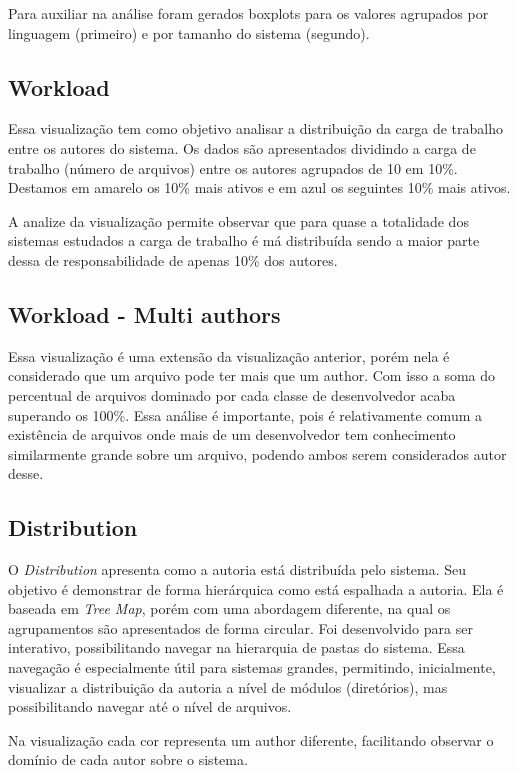 \documentclass[12pt]{article}
\begin{document}
Para auxiliar na análise foram gerados boxplots para os valores agrupados por linguagem (primeiro) e por tamanho do sistema (segundo).


\subsection{Workload}

Essa visualização tem como objetivo analisar a distribuição da carga de trabalho entre os autores do sistema. Os dados são apresentados dividindo a carga de trabalho (número de arquivos) entre os autores agrupados de 10 em 10\%. Destamos em amarelo os 10\% mais ativos e em azul os seguintes 10\% mais ativos. 

A analize da visualização permite observar que para quase a totalidade dos sistemas estudados a carga de trabalho é má distribuída sendo a maior parte dessa de responsabilidade de apenas 10\% dos autores.

\subsection{Workload - Multi authors}

Essa visualização é uma extensão da visualização anterior, porém nela é considerado que um arquivo pode ter mais que um author. Com isso a soma do percentual de arquivos dominado por cada classe de desenvolvedor acaba superando os 100\%. Essa análise é importante, pois é relativamente comum a existência de arquivos onde mais de um desenvolvedor tem conhecimento similarmente grande sobre um arquivo, podendo ambos serem considerados autor desse.

\subsection{Distribution}

O \textit{Distribution} apresenta como a autoria está distribuída pelo sistema. Seu objetivo é demonstrar de forma hierárquica como está espalhada a autoria. Ela é baseada em \textit{Tree Map}, porém com uma abordagem diferente, na qual os agrupamentos são apresentados de forma circular. Foi desenvolvido para ser interativo, possibilitando navegar na hierarquia de pastas do sistema. Essa navegação é especialmente útil para sistemas grandes, permitindo, inicialmente, visualizar a distribuição da autoria a nível de módulos (diretórios), mas possibilitando navegar até o nível de arquivos.

Na visualização cada cor representa um author diferente, facilitando observar o domínio de cada autor sobre o sistema.

\footnotesize


\end{document}
